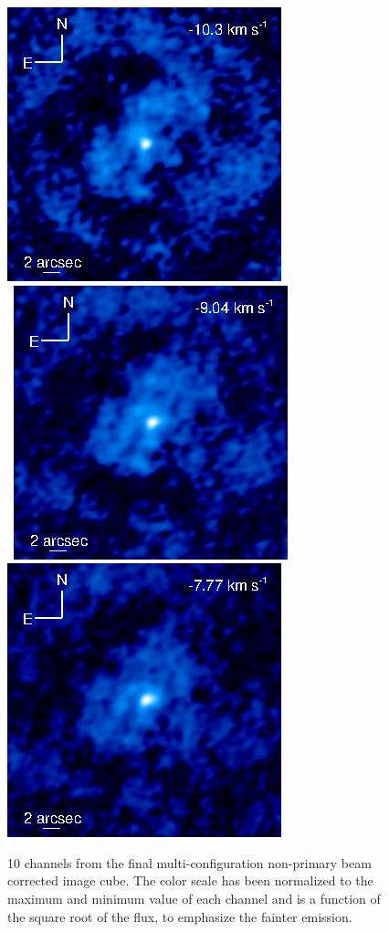 \documentclass[manuscript]{aastex}
\begin{document}
\begin{figure}[hbt!]
{          \includegraphics[]{f9.eps}
         }
\\
\mbox{
          \includegraphics[]{f10.eps}
          \includegraphics[]{f11.eps}
         }
\caption[]{10 channels from the final multi-configuration non-primary beam corrected image cube. The color scale has been normalized to the maximum and minimum value of each channel and is a function of the square root of the flux, to emphasize the fainter emission.}
\label{fig2}
\end{figure}
\end{document}
